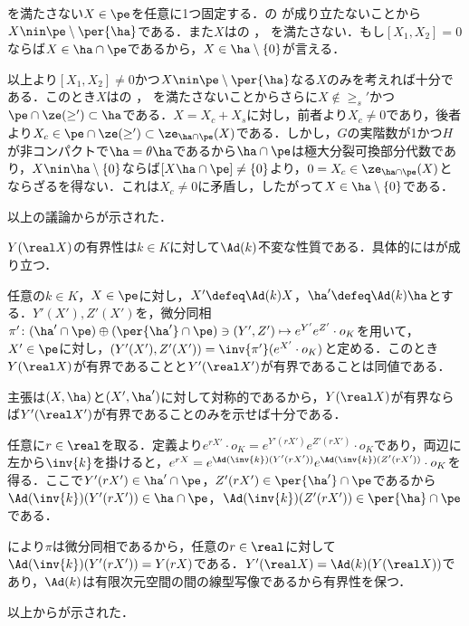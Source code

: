 \begin{npfwn}
\begin{enumerate}[label=\textbf{\arabic*.}]
    
    
    を満たさない$X\in \pe$を任意に1つ固定する．の  が成り立たないことから$X\nin \pe\setminus\per{\ha}$である．また$X$はの ， を満たさない．もし$[X_1, X_2] = 0 $ ならば$X\in\ha\cap \pe $であるから，$X\in \ha\setminus\{0\} $が言える．

    以上より$[X_1,X_2] \neq 0$かつ$X\nin \pe\setminus\per{\ha}$なる$X$のみを考えれば十分である．このとき$X$はの ， を満たさないことからさらに$X\nin \ge_{s}' $かつ$\pe\cap\ze(\ge')\subset \ha $である．$X  = X_c + X_s $に対し，前者より$X_c\neq 0 $であり，後者より$X_c\in \pe\cap\ze(\ge')\subset \ze_{\ha\cap\pe}(X) $である．しかし，$G$の実階数が1かつ$H$が非コンパクトで$\ha = \theta\ha$であるから$\ha\cap\pe$は極大分裂可換部分代数であり，$X\nin\ha\setminus\{0\} $ならば$[X \ha\cap\pe ] \neq  \{0\}$より，$0 = X_c \in \ze_{\ha\cap\pe}(X) $とならざるを得ない．これは$X_c\neq 0 $に矛盾し，したがって$X \in \ha\setminus\{0\}  $である．
    
    以上の議論からが示された．
  \end{enumerate}  
\end{npfwn}

$Y(\real X) $の有界性は$k\in K$に対して$\Ad(k) $不変な性質である．具体的にはが成り立つ．
\begin{lem}\label{lem:1101}
  任意の$k\in K$，$X\in \pe$に対し，$X'\defeq \Ad(k)X $，$\ha'\defeq \Ad(k)\ha $とする．$Y'(X'), Z'(X') $を，微分同相$\pi'\colon (\ha'\cap \pe)\oplus (\per{\ha'}\cap \pe)\ni (Y',Z')\mapsto e^{Y'}e^{Z'}\cdot o_K  $を用いて，$X'\in \pe$に対し，$(Y'(X'), Z'(X')) = \inv{\pi'}(e^{X'}\cdot o_K) $と定める．このとき$Y(\real X)$が有界であることと$ Y'(\real X') $が有界であることは同値である．
\end{lem}

\begin{npfwn}
  主張は$(X,\ha) $と$(X',\ha')$に対して対称的であるから，$Y(\real X) $が有界ならば$Y'(\real X') $が有界であることのみを示せば十分である．

  任意に$r\in \real$を取る．定義より$e^{rX'}\cdot o_K = e^{Y'(r X')}e^{Z'(r X')}\cdot o_K  $であり，両辺に左から$\inv{k} $を掛けると，$e^{r X} = e^{\Ad(\inv{k})( Y'(r X'))}e^{\Ad(\inv{k})( Z'(r X'))}\cdot o_K  $を得る．ここで$Y'(rX')\in \ha'\cap \pe $，$Z'(r X')\in \per{\ha'}\cap \pe $であるから$\Ad(\inv{k})(Y'(r X'))\in \ha\cap \pe $，$\Ad(\inv{k})(Z'(r X')) \in \per{\ha}\cap \pe $である．

  により$\pi$は微分同相であるから，任意の$r\in \real$に対して$\Ad(\inv{k})(Y'(r X')) = Y(rX)  $である．$Y'(\real X) = \Ad(k)(Y(\real X))  $であり，$\Ad(k) $は有限次元空間の間の線型写像であるから有界性を保つ．

  以上からが示された．  
\end{npfwn}


